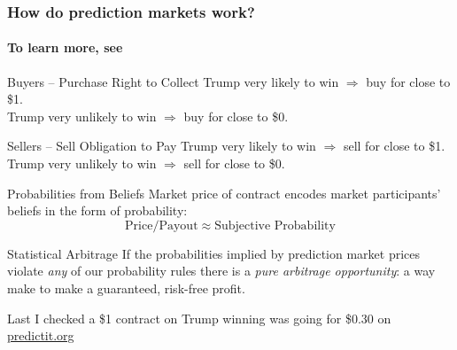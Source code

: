 \documentclass{beamer}
\begin{document}
\begin{frame}

\frametitle{How do prediction markets work?}
\framesubtitle{To learn more, see }
\begin{center}
\vspace{1em}

\begin{block}{Buyers -- Purchase Right to Collect}
Trump very likely to win $\Rightarrow$ buy for close to \$1. \\Trump very unlikely to win $\Rightarrow$ buy for close to \$0.
\end{block}

\begin{block}{Sellers -- Sell Obligation to Pay} 
Trump very likely to win $\Rightarrow$ sell for close to \$1. \\Trump very unlikely to win $\Rightarrow$ sell for close to \$0.
\end{block}
\end{center}

\end{frame}
\begin{frame}

  \begin{block}{Probabilities from Beliefs}
    Market price of contract encodes market participants' beliefs in the form of probability:
$$\mbox{Price}/\mbox{Payout}\approx \mbox{Subjective Probability}$$
  \end{block} \pause

	\begin{alertblock}{Statistical Arbitrage}
    If the probabilities implied by prediction market prices violate \emph{any} of our probability rules there is a \emph{pure arbitrage opportunity}: a way make to make a guaranteed, risk-free profit.
	\end{alertblock} \pause

  \vspace{1em}
  \alert{Last I checked a \$1 contract on Trump winning was going for \$0.30 on \url{predictit.org}}
\end{frame}
\end{document}

